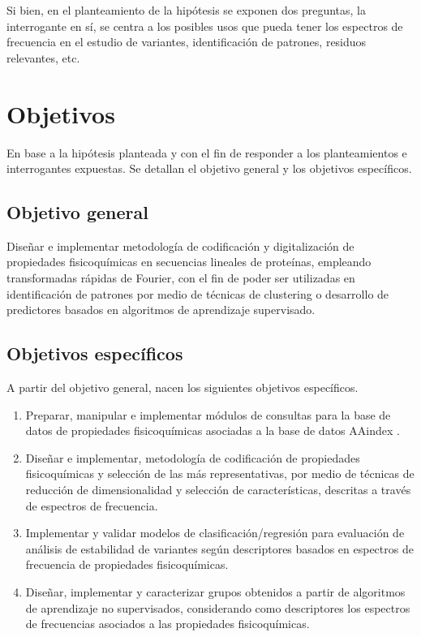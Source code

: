 Si bien, en el planteamiento de la hipótesis se exponen dos preguntas, la interrogante en sí, se centra a los posibles usos que pueda tener los espectros de frecuencia en el estudio de variantes, identificación de patrones, residuos relevantes, etc.

\section{Objetivos}

En base a la hipótesis planteada y con el fin de responder a los planteamientos e interrogantes expuestas. Se detallan el objetivo general y los objetivos específicos.

\subsection{Objetivo general}

Diseñar e implementar metodología de codificación y digitalización de propiedades fisicoquímicas en secuencias lineales de proteínas, empleando transformadas rápidas de Fourier, con el fin de poder ser utilizadas en identificación de patrones por medio de técnicas de clustering o desarrollo de predictores basados en algoritmos de aprendizaje supervisado.

\subsection{Objetivos específicos}

A partir del objetivo general, nacen los siguientes objetivos específicos.

\begin{enumerate}
	
	\item Preparar, manipular e implementar módulos de consultas para la base de datos de propiedades fisicoquímicas asociadas a la base de datos AAindex \cite{Kawashima2000}.
	
	\item Diseñar e implementar, metodología de codificación de propiedades fisicoquímicas y selección de las más representativas, por medio de técnicas de reducción de dimensionalidad y selección de características, descritas a través de espectros de frecuencia.
	
	\item Implementar y validar modelos de clasificación/regresión para evaluación de análisis de estabilidad de variantes según descriptores basados en espectros de frecuencia de propiedades fisicoquímicas.
		
	\item Diseñar, implementar y caracterizar grupos obtenidos a partir de algoritmos de aprendizaje no supervisados, considerando como descriptores los espectros de frecuencias asociados a las propiedades fisicoquímicas.
	
\end{enumerate}

